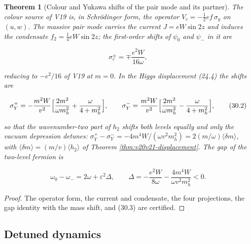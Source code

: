 \documentclass[11pt]{article}
\newtheorem{theorem}{Theorem}[section]
\theoremstyle{remark}
\begin{document}
\begin{theorem}[Colour and Yukawa shifts of the pair mode and its partner]
\label{thm:v20v27-shifts}
The colour source of V19 is, in Schr\"odinger form, the operator
\(V_c=-\tfrac12ef\,\sigma_y\) on \((u,w)\).  The massive pair mode
carries the current \(J=eW\sin2z\) and induces the condensate
\(f_2=\tfrac14eW\sin2z\); the first-order shifts of \(\psi_0\) and
\(\psi_-\) in it are

\[
 \sigma_c^{\pm}=\mp\frac{e^2W}{16\omega},                              \tag{30.1}
\]

reducing to \(-e^2/16\) of V19 at \(m=0\).  In the Higgs displacement
(24.4) the shifts are

\[
 \sigma_Y^+=-\frac{m^2W}{v^2}\Bigl[\frac{2m^2}{\omega m_h^2}+\frac{\omega}{4+m_h^2}\Bigr],\qquad
 \sigma_Y^-=\frac{m^2W}{v^2}\Bigl[\frac{2m^2}{\omega m_h^2}-\frac{\omega}{4+m_h^2}\Bigr],
                                                                    \tag{30.2}
\]

so that the wavenumber-two part of \(h_2\) shifts both levels equally
and only the vacuum depression detunes:
\(\sigma_Y^+-\sigma_Y^-=-4m^4W/(\omega v^2m_h^2)=2(m/\omega)\langle\delta m\rangle\),
with \(\langle\delta m\rangle=(m/v)\langle h_2\rangle\) of Theorem
\ref{thm:v20v21-displacement}.  The gap of the two-level fermion is

\[
 \omega_0-\omega_-=2\omega+\varepsilon^2\Delta,\qquad
 \Delta=-\frac{e^2W}{8\omega}-\frac{4m^4W}{\omega v^2m_h^2}<0.          \tag{30.3}
\]
\end{theorem}

\begin{proof}
The operator form, the current and condensate, the four projections,
the gap identity with the mass shift, and (30.3) are certified.
\end{proof}

\subsection{Detuned dynamics}
\end{document}
